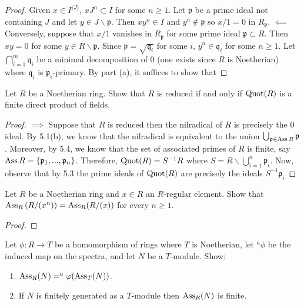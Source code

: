 \begin{proof}
Given $x\in I^{\langle J\rangle}$, $xJ^n\subset I$ for some
$n\geq 1$. Let $\mathfrak{p}$ be a prime ideal not containing $J$
and let $y\in J\smallsetminus\mathfrak{p}$. Then $xy^n\in I$ and
$y^n\notin\mathfrak{p}$ so $x/1=0$ in
$R_{\mathfrak{p}}$. $\impliedby$ Conversely, suppose that $x/1$
vanishes in $R_{\mathfrak{p}}$ for some prime ideal
$\mathfrak{p}\subset R$. Then $xy=0$ for some
$y\in R\smallsetminus\mathfrak{p}$. Since
$\mathfrak{p}=\sqrt{\mathfrak{q}_i}$ for some $i$,
$y^n\in\mathfrak{q}_i$ for some $n\geq 1$. Let
$\bigcap_{i=1}^m\mathfrak{q}_i$ be a minimal decomposition of $0$
(one exists since $R$ is Noetherian) where $\mathfrak{q}_i$ is
$\mathfrak{p}_i$-primary. By part (a), it suffices to show that
\end{proof}
\newpage
\begin{problem}
Let $R$ be a Noetherian ring. Show that $R$ is reduced if and
only if $\operatorname{Quot}(R)$ is a finite direct product of fields.
\end{problem}
\begin{proof}
$\implies$ Suppose that $R$ is reduced then the nilradical of $R$ is
precisely the $0$ ideal. By 5.1(b), we know that the nilradical is
equivalent to the union
$\bigcup_{\mathfrak{p}\in\operatorname{Ass} R}\mathfrak{p}$. Moreover, by 5.4, we know
that the set of associated primes of $R$ is finite, say
$\operatorname{Ass} R=\{\mathfrak{p}_1,...,\mathfrak{p}_n\}$. Therefore,
$\operatorname{Quot}(R)=S^{-1}R$ where $S=R\smallsetminus\bigcup_{i=1}^n\mathfrak{p}_i$.
Now, observe that by 5.3 the prime ideals of $\operatorname{Quot}(R)$
are precisely the ideals $S^{-1}\mathfrak{p}_i$
\end{proof}
\newpage
\begin{problem}
Let $R$ be a Noetherian ring and $x\in R$ an $R$-regular
element. Show that $\operatorname{Ass}_R\left(R/(x^n)\right)=\operatorname{Ass}_R(R/(x))$ for
every $n\geq 1$.
\end{problem}
\begin{proof}
\end{proof}
\newpage
\begin{problem}
Let $\phi\colon R\to T$ be a homomorphism of rings where $T$ is
Noetherian, let $^a\phi$ be the induced map on the spectra, and
let $N$ be a $T$-module. Show:
\begin{enumerate}[label=(\alph*)]
\item $\operatorname{Ass}_R(N)=^a\varphi(\operatorname{Ass}_T(N))$.
\item If $N$ is finitely generated as a $T$-module then
  $\operatorname{Ass}_R(N)$ is finite.
\end{enumerate}
\end{problem}
